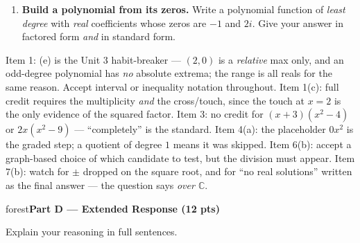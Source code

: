 \documentclass[10pt]{article}
\newcommand{\parthead}[1]{%
  \vspace{6pt}\noindent
  \begin{headlinebox}{forest}\color{white}\bfseries #1\end{headlinebox}%
  \vspace{4pt}}
\begin{document}
\begin{enumerate}[leftmargin=1.9em, itemsep=10pt]
  \item \textbf{Build a polynomial from its zeros.} Write a polynomial function of \emph{least degree}
        with \emph{real} coefficients whose zeros are $-1$ and $2i$. Give your answer in factored form
        \emph{and} in standard form.
        \vadjust{\nobreak}\vspace{16pt}
\end{enumerate}

\begin{teachernote}
Item 1: (e) is the Unit 3 habit-breaker --- $(2,0)$ is a \emph{relative} max only, and an odd-degree
polynomial has \emph{no} absolute extrema; the range is all reals for the same reason. Accept
interval or inequality notation throughout. Item 1(c): full credit requires the multiplicity
\emph{and} the cross/touch, since the touch at $x=2$ is the only evidence of the squared factor.
Item 3: no credit for $(x+3)(x^2-4)$ or $2x(x^2-9)$ --- ``completely'' is the standard. Item 4(a):
the placeholder $0x^2$ is the graded step; a quotient of degree $1$ means it was skipped. Item 6(b):
accept a graph-based choice of which candidate to test, but the division must appear. Item 7(b):
watch for $\pm$ dropped on the square root, and for ``no real solutions'' written as the final
answer --- the question says \emph{over $\mathbb{C}$}.
\end{teachernote}

\boxguard[36]%
\parthead{Part D --- Extended Response (12 pts)}
Explain your reasoning in full sentences.
\end{document}
